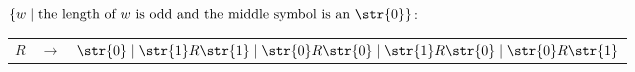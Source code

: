 $\{w \mid \text{the length of $w$ is odd and the middle symbol is an \str{0}}\}$: \par
\begin{tabular}{ccl}
	$R$ & $\rightarrow$ & $\str{0} \mid \str{1}R\str{1} \mid \str{0}R\str{0} \mid \str{1}R\str{0} \mid \str{0}R\str{1}$ \\
\end{tabular}